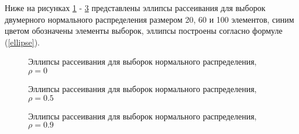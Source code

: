 \documentclass[12pt]{article}
\begin{document}
Ниже на рисунках \ref{rho_0} - \ref{rho_09} представлены эллипсы рассеивания для выборок двумерного нормального распределения размером 20, 60 и 100 элементов, синим цветом обозначены элементы выборок, эллипсы построены согласно формуле (\ref{ellipse}).
\begin{figure}[h]
    \begin{minipage}[h]{0.5\linewidth}
    \end{minipage}
    \begin{minipage}[h]{0.5\linewidth}
    \end{minipage}
    \begin{minipage}[h]{0.5\linewidth}
    \end{minipage}
    \caption{Эллипсы рассеивания для выборок нормального распределения, $\rho = 0$}
    \label{rho_0}
\end{figure}

\begin{figure}[h]
    \begin{minipage}[h]{0.5\linewidth}
    \end{minipage}
    \begin{minipage}[h]{0.5\linewidth}
    \end{minipage}
    \begin{minipage}[h]{0.5\linewidth}
    \end{minipage}
    \caption{Эллипсы рассеивания для выборок нормального распределения, $\rho = 0.5$}
    \label{rho_05}
\end{figure}

\begin{figure}[h!]
    \begin{minipage}[h]{0.5\linewidth}
    \end{minipage}
    \begin{minipage}[h]{0.5\linewidth}
    \end{minipage}
    \begin{minipage}[h]{0.5\linewidth}
    \end{minipage}
    \caption{Эллипсы рассеивания для выборок нормального распределения, $\rho = 0.9$}
    \label{rho_09}
\end{figure}
\end{document}
